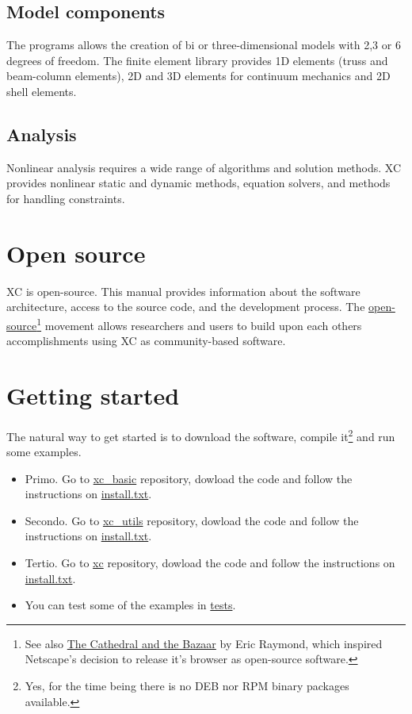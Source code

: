 \subsection{Model components}

The programs allows the creation of bi or three-dimensional models with 2,3 or 6 degrees of freedom. The finite element library provides 1D elements (truss and beam-column elements), 2D and 3D elements for continuum mechanics and 2D shell elements.

\subsection{Analysis}
Nonlinear analysis requires a wide range of algorithms and solution methods. XC provides nonlinear static and dynamic methods, equation solvers, and methods for handling constraints.

\section{Open source}
XC is open-source. This manual provides information about the software architecture, access to the source code, and the development process. The \href{https://opensource.org/}{open-source}\footnote{See also \href{http://www.unterstein.net/su/docs/CathBaz.pdf}{The Cathedral and the Bazaar} by Eric Raymond, which inspired Netscape's decision to release it's browser as open-source software.} movement allows researchers and users to build upon each others accomplishments using XC as community-based software.

\section{Getting started}

The natural way to get started is to download the software, compile it\footnote{Yes, for the time being there is no DEB nor RPM binary packages available.} and run some examples.

\begin{itemize}
\item Primo. Go to \href{https://github.com/lcpt/xc_basic}{xc\_basic} repository, dowload the code and follow the instructions on \href{https://github.com/lcpt/xc_basic/blob/master/install.txt}{install.txt}.
\item Secondo. Go to \href{https://github.com/lcpt/xc_utils}{xc\_utils} repository, dowload the code and follow the instructions on \href{https://github.com/lcpt/xc_utils/blob/master/install.txt}{install.txt}.
\item Tertio. Go to \href{https://github.com/lcpt/xc}{xc} repository, dowload the code and follow the instructions on \href{https://github.com/lcpt/xc/blob/master/install.txt}{install.txt}.
\item You can test some of the examples in \href{https://github.com/lcpt/xc/tree/master/verif/tests}{tests}.
\end{itemize}






